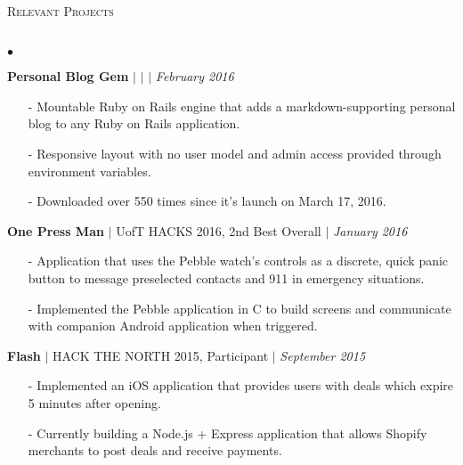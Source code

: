 \documentclass[10pt]{article}
\newcommand{\lineunder}{\vspace*{-8pt} \\ \hspace*{-18pt} \hrulefill \\}
\newcommand{\header}[1]{{\hspace*{-15pt}\vspace*{6pt} \textsc{#1}} \vspace*{-6pt} \lineunder }
\newenvironment{achievements}{\begin{list}{$\bullet$}{\topsep 0pt \itemsep -1.5pt \leftmargin 5pt}}{\vspace*{4pt}\end{list}}
\begin{document}
\header{\fontsize{11}{12}\selectfont Relevant Projects}
\begin{achievements}
\def\UrlFont{\em}
\item \textbf{Personal Blog Gem}  $|$  \href{https://github.com/nakulpathak3/personal-blog-gem}{\faGithub}   $|$  \href{http://nakulpathak.com/blog}{\faExternalLink}  $|$  \href{http://rubygems.org/gems/personal_blog}{\faDiamond} \hfill \textit {February 2016}
\begin{itemize}
\item[-]Mountable Ruby on Rails engine that adds a markdown-supporting personal blog to any Ruby on Rails application.
\vspace{2pt}
\item[-]Responsive layout with no user model and admin access provided through environment variables.
\vspace{2pt}
\item[-]Downloaded over 550 times since it's launch on March 17, 2016.
\end{itemize}
\vspace{2pt}
\item \textbf{One Press Man} {$|$ \scriptsize UofT HACKS 2016, 2nd Best Overall} $|$  \href{https://github.com/adrianmachado/Onepressman}{\faGithub} \hfill \textit {January 2016}
\begin{itemize}
\item[-]Application that uses the Pebble watch's controls as a discrete, quick panic button to message preselected contacts and 911 in emergency situations.
\vspace{2pt}
\item[-]Implemented the Pebble application in C to build screens and communicate with companion Android application when triggered.
\end{itemize}
\vspace{2pt}
\item \textbf{Flash} {$|$ \scriptsize HACK THE NORTH 2015, Participant} $|$  \href{https://github.com/nakulpathak3/Flash}{\faGithub} \hfill \textit {September 2015}
\begin{itemize}
\item[-]Implemented an iOS application that provides users with deals which expire 5 minutes after opening.
\vspace{2pt}
\item[-]Currently building a Node.js + Express application that allows Shopify merchants to post deals and receive payments.
\end{itemize}

\end{achievements}
\end{document}
